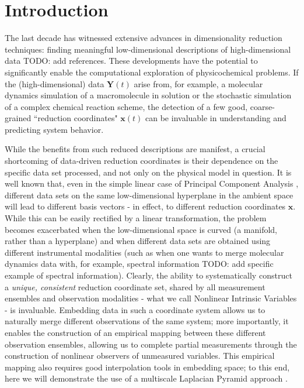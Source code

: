 \documentclass[aip,jcp,preprint]{revtex4-1}
\begin{document}

\maketitle

\section{Introduction}
The last decade has witnessed extensive advances in dimensionality reduction techniques:
finding meaningful low-dimensional descriptions of high-dimensional data {\color{red} TODO: add references}.
%
These developments have the potential to significantly enable the computational exploration
of physicochemical problems.
%
If the (high-dimensional) data $\mathbf{Y}(t)$ arise from, for example, a
molecular dynamics simulation of a macromolecule in solution or the stochastic
simulation of a complex chemical reaction scheme, the detection of a few good, coarse-grained
``reduction coordinates" $\mathbf{x}(t)$ can be invaluable in understanding and predicting system behavior.

While the benefits from such reduced descriptions are manifest, a crucial shortcoming of
 data-driven reduction coordinates is their dependence on the specific data set processed,
and not only on the physical model in question.
%
It is well known that, even in the simple linear case of Principal Component Analysis \cite{jolliffe2005principal},
different data sets on the same low-dimensional hyperplane in the ambient space
will lead to different basis vectors - in effect, to different reduction coordinates $\mathbf{x}$.
%
While this can be easily rectified by a linear transformation, the problem becomes
exacerbated when the low-dimensional space is curved (a manifold, rather than a hyperplane)
and when different data sets are obtained using different instrumental modalities
(such as when one wants to merge molecular dynamics data with, for example, spectral information {\color{red} TODO: add specific example of spectral information}).
%
Clearly, the ability to systematically construct a {\em unique, consistent} reduction
coordinate set, shared by all measurement ensembles and observation modalities -
what we call Nonlinear Intrinsic Variables - is invaluable.
%
Embedding data in such a coordinate system allows us to naturally merge different observations of the same system;
more importantly, it enables the construction of an empirical mapping between these different
observation ensembles, allowing us to complete partial measurements through the construction
of nonlinear observers of unmeasured variables.
%
This empirical mapping also requires good interpolation tools in embedding space; to this
end, here we will demonstrate the use of a multiscale Laplacian Pyramid approach \cite{rabin2012heterogeneous}.
\end{document}
